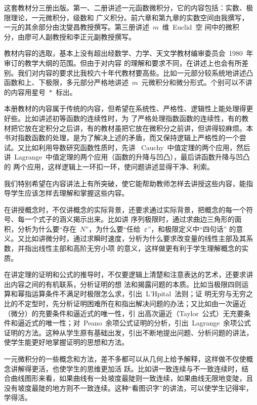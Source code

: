 
\begin{preface}
这套教材分三册出版。第一、二册讲述一元函数微积分，它的内容包括：实数、极限理论，一元微积分，级数和
广义积分。前六章和第九章的实数空间由我撰写，一元的其余部分由沈燮昌教授撰写。第三册讲述~$m$~维~Euclid~空
间中的微积分，由廖可人副教授和李正元副教授撰写。

教材内容的选取，基本上没有超出经数学、力学、天文学教材编审委员会~1980~年审订的教学大纲的范围。但由于对内容
的理解和要求不同，在讲述上也会有所差别。我们对内容的要求比我校六十年代教材要高些。比如一元部分较系统地讲述凸
函数和上、下极限，多元部分严格地讲述~$m$~元微积分和微分形式。个别可以不讲的内容用星号~$\ast$~标出。

本册教材的内容属于传统的内容，但希望在系统性、严格性、逻辑性上能处理得更好些。比如讲述初等函数的连续性时，为
了严格处理指数函数的连续性，有的教材把它放在定积分之后讲，有的教材虽把它放在微积分之前讲，但讲得较麻烦。本
书对指数函数的处理，是为了解决上述的矛盾，而又保持逻辑上严格性的一个尝试。又比如利用导数研究函数性质时，先讲
~Cauchy~中值定理的两个应用，然后讲~Lagrange~中值定理的两个应用（函数的升降与凹凸），最后讲函数升降与凹凸的
两个应用，这样逻辑上一环扣一环，使问题讲述显得干净、利索。

我们特别希望在内容讲法上有所突破，使它能帮助教师怎样去讲授这些内容，能指导学生应该怎样去理解和掌握这些内容。

在讲授概念时，不仅讲概念的实际背景，还要求通过实际背景，把概念的每一个符号、每一个式子的涵义揭示出来。比如讲
序列极限时，通过求曲边三角形的面积，分析为什么要“存在~$N$”，为什么要“任给~$\varepsilon$”，和极限定义中“四句话”%
的意义。又比如讲微分时，通过求瞬时速度，分析为什么要求改变量的线性主部及其系数，并指出线性主部和高阶无穷小项
的意义，这样做更有利于学生理解概念的实质。

在讲定理的证明和公式的推导时，不仅要逻辑上清楚和注意表达的艺术，还要求讲出内容之间的有机联系，分析证明的想
法和揭露问题的本质。比如当极限四则运算和幂指运算条件不满足时极限怎么求，引出~L'Hpital~法则；证
明无穷与无穷之
比的不定型时，先分析证明困难所在和指出解决问题的办法；又比如由一次逼近（微分）的充要条件和逼近式的唯一性，引
出高次逼近（Taylor~公式）无充要条件和逼近式的唯一性；对~Peano~余项公式证明的分析，引出~Lagrange~余项公式
证明的方法。这种从学生原有基础出发，引出不断地提出问题、分析问题的讲法，使学生能更好地掌握证明的思想和方法。

一元微积分的一些概念和方法，差不多都可以从几何上给予解释，这样做不仅使概念讲解得更活，也使学生的思维更加活
跃。比如讲一致连续与不一致连续时，结合曲线图形来看，如果曲线有一处坡度最陡则一致连续，如果曲线无限地变陡，且
没有坡度最陡的地方则不一致连续。这种“看图识字”的讲法，可以使学生记得牢，学得活。


\end{preface}
